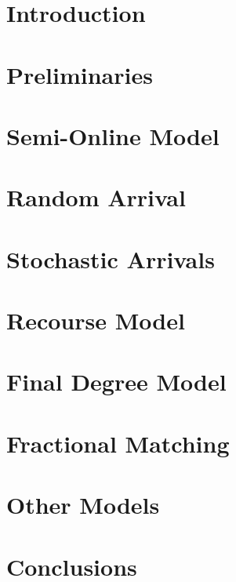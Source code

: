 \documentclass[fleqn]{report}
\numberwithin{remark}{section}
\numberwithin{lemma}{section}
\numberwithin{definition}{section}
\numberwithin{claim}{section}
\numberwithin{fact}{section}
\theoremstyle{case}
\begin{document}
\chapter{Introduction}



\tableofcontents

\chapter{Preliminaries}


\chapter{Semi-Online Model}


\chapter{Random Arrival}


\chapter{Stochastic Arrivals}


\chapter{Recourse Model}


\chapter{Final Degree Model}


\chapter{Fractional Matching}


\chapter{Other Models}


\chapter{Conclusions}


\clearpage
\printbibliography[]
\end{document}
